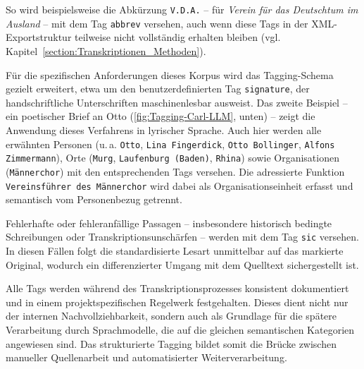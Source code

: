 \documentclass[12pt, a4paper, ngerman, bidi=default]{article}
\begin{document}
So wird beispielsweise die Abkürzung \texttt{V.D.A.} – für \textit{Verein für das Deutschtum im Ausland} – mit dem Tag \texttt{abbrev} versehen, 
auch wenn diese Tags in der XML-Exportstruktur teilweise nicht vollständig erhalten bleiben (vgl. Kapitel~\ref{section:Transkriptionen_Methoden}).

Für die spezifischen Anforderungen dieses Korpus wird das Tagging-Schema gezielt erweitert, etwa um den benutzerdefinierten Tag \texttt{signature}, 
der handschriftliche Unterschriften maschinenlesbar ausweist. Das zweite Beispiel – ein poetischer Brief an Otto (\autoref{fig:Tagging-Carl-LLM}, unten) – 
zeigt die Anwendung dieses Verfahrens in lyrischer Sprache. Auch hier werden alle erwähnten Personen (u.\,a. \texttt{Otto}, \texttt{Lina Fingerdick}, 
\texttt{Otto Bollinger}, \texttt{Alfons Zimmermann}), Orte (\texttt{Murg}, \texttt{Laufenburg (Baden)}, \texttt{Rhina}) sowie Organisationen 
(\texttt{Männerchor}) mit den entsprechenden Tags versehen. Die adressierte Funktion \texttt{Vereinsführer des Männerchor} wird dabei 
als Organisationseinheit erfasst und semantisch vom Personenbezug getrennt.

Fehlerhafte oder fehleranfällige Passagen – insbesondere historisch bedingte Schreibungen oder Transkriptionsunschärfen – 
werden mit dem Tag \texttt{sic} versehen. In diesen Fällen folgt die standardisierte Lesart unmittelbar auf das markierte Original, 
wodurch ein differenzierter Umgang mit dem Quelltext sichergestellt ist.

Alle Tags werden während des Transkriptionsprozesses konsistent dokumentiert und in einem projektspezifischen Regelwerk festgehalten. 
Dieses dient nicht nur der internen Nachvollziehbarkeit, sondern auch als Grundlage für die spätere Verarbeitung durch Sprachmodelle, 
die auf die gleichen semantischen Kategorien angewiesen sind. Das strukturierte Tagging bildet somit die Brücke zwischen manueller 
Quellenarbeit und automatisierter Weiterverarbeitung.
\end{document}
